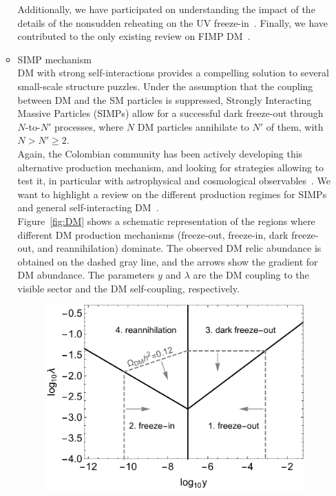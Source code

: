 \documentclass[a4paper,11pt]{article}
\begin{document}
\begin{enumerate}
\begin{itemize}
Additionally, we have participated on understanding the impact of the details of the nonsudden reheating on the UV freeze-in~\cite{Bernal:2018qlk, Bernal:2020bfj, Bernal:2020gzm, Bernal:2020qyu}.
Finally, we have contributed to the only existing review on FIMP DM~\cite{Bernal:2017kxu}.
%
\item
SIMP mechanism\\
DM with strong self-interactions provides a compelling solution to several small-scale structure puzzles.
Under the assumption that the coupling between DM and the SM particles is suppressed, Strongly Interacting Massive Particles (SIMPs) allow for a successful dark freeze-out through $N$-to-$N'$ processes, where $N$ DM particles annihilate to $N'$ of them, with $N>N'\geq 2$.\\
Again, the Colombian community has been actively developing this alternative production mechanism, and looking for strategies allowing to test it, in particular with astrophysical and cosmological observables~\cite{Bernal:2015bla, Bernal:2015ova, Bernal:2015xba, Bernal:2017mqb, Bernal:2019uqr, Bernal:2020gzm}.
We want to highlight a review on the different production regimes for SIMPs and general self-interacting DM~\cite{Bernal:2015ova}.\\
Figure~\ref{fig:DM} shows a schematic representation of the regions where different DM production mechanisms (freeze-out, freeze-in, dark freeze-out, and reannihilation) dominate. The observed DM relic abundance is obtained on the dashed gray line, and the arrows show the gradient for DM abundance. The parameters $y$ and $\lambda$ are the DM coupling to the visible sector and the DM self-coupling, respectively.
\begin{figure}
	\centering
	\includegraphics[scale=0.53]{plots/phases.pdf}

\end{figure}
\end{itemize}
\end{enumerate}
\end{document}
